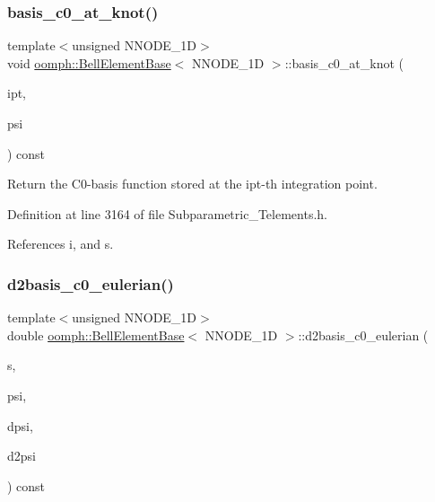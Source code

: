 \subsubsection{\texorpdfstring{basis\+\_\+c0\+\_\+at\+\_\+knot()}{basis\_c0\_at\_knot()}}
{\footnotesize\ttfamily template$<$unsigned N\+N\+O\+D\+E\+\_\+1D$>$ \\
void \hyperlink{classoomph_1_1BellElementBase}{oomph\+::\+Bell\+Element\+Base}$<$ N\+N\+O\+D\+E\+\_\+1D $>$\+::basis\+\_\+c0\+\_\+at\+\_\+knot (\begin{DoxyParamCaption}\item[{const unsigned \&}]{ipt,  }\item[{\hyperlink{classoomph_1_1Shape}{Shape} \&}]{psi }\end{DoxyParamCaption}) const\hspace{0.3cm}{\ttfamily [inline]}}



Return the C0-\/basis function stored at the ipt-\/th integration point. 



Definition at line 3164 of file Subparametric\+\_\+\+Telements.\+h.



References i, and s.

\mbox{\label{classoomph_1_1BellElementBase_ac975de34dadf1e1409bb022af6ed1b1d}} 
\subsubsection{\texorpdfstring{d2basis\+\_\+c0\+\_\+eulerian()}{d2basis\_c0\_eulerian()}}
{\footnotesize\ttfamily template$<$unsigned N\+N\+O\+D\+E\+\_\+1D$>$ \\
double \hyperlink{classoomph_1_1BellElementBase}{oomph\+::\+Bell\+Element\+Base}$<$ N\+N\+O\+D\+E\+\_\+1D $>$\+::d2basis\+\_\+c0\+\_\+eulerian (\begin{DoxyParamCaption}\item[{const \hyperlink{classoomph_1_1Vector}{Vector}$<$ double $>$ \&}]{s,  }\item[{\hyperlink{classoomph_1_1Shape}{Shape} \&}]{psi,  }\item[{\hyperlink{classoomph_1_1DShape}{D\+Shape} \&}]{dpsi,  }\item[{\hyperlink{classoomph_1_1DShape}{D\+Shape} \&}]{d2psi }\end{DoxyParamCaption}) const\hspace{0.3cm}{\ttfamily [inline]}}



